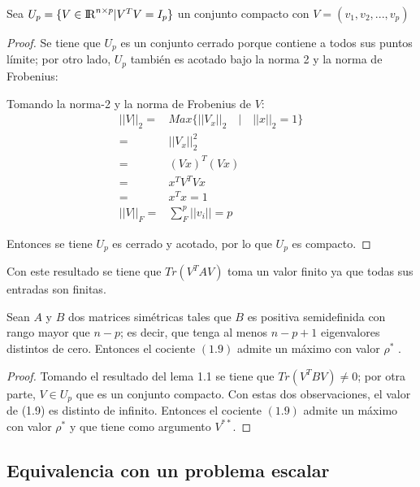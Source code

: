 \begin{lemma}
Sea $U_p = \{ V \in {\rm I\!R}^{n \times p} | V^T V = I_p \} $ un conjunto compacto con $V = (v_1, v_2, ... , v_p)$
\end{lemma}
\begin{proof}
Se tiene que $U_p$ es un conjunto cerrado porque contiene a todos sus puntos límite; por otro lado, $U_p$ también es acotado bajo la norma 2 y la norma de Frobenius:

Tomando la norma-2 y la norma de Frobenius de $V$: 
\begin{equation*}
\begin{aligned}
	||V||_2 =& Max \{||V_x ||_2 \quad | \quad ||x||_2 = 1 \} \\
		    =& ||V_x||^2_2  \\
		    =& (Vx)^T (Vx) \\
		    =& x^T V^T V x\\
		    =& x^T x = 1\\
	||V||_F	=& \sum\limits_{F}^{p} ||v_i|| = p   
\end{aligned}
\end{equation*}

Entonces se tiene $U_p$ es cerrado y acotado, por lo que $U_p$ es compacto.
\end{proof}

Con este resultado se tiene que $Tr(V^T A V)$ toma un valor finito ya que todas sus entradas son finitas. 


\begin{lemma}\label{lemma2.5}
Sean $A$ y $B$ dos matrices simétricas tales que $B$ es positiva semidefinida con rango mayor que $n-p$; es decir, que tenga al menos $n-p+1$ eigenvalores distintos de cero. Entonces el cociente $(1.9)$ admite un máximo con valor $\rho^*$ \cite{ngo2012trace}.
\end{lemma}

\begin{proof}
Tomando el resultado del lema 1.1 se tiene que $Tr(V^T B V) \neq 0$; por otra parte, $V \in U_p$ que es un conjunto compacto. Con estas dos observaciones, el valor de (1.9) es distinto de infinito. Entonces el cociente $(1.9)$ admite un máximo con valor $\rho^*$ y que tiene como argumento $V^{**}$.
\end{proof}

\subsection{Equivalencia con un problema escalar}

